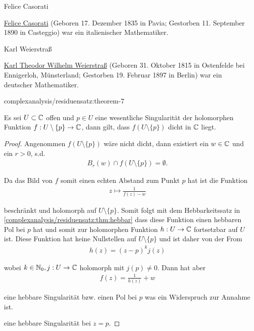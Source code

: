 \begin{emphBox}{Felice Casorati}{}

\par
\href{https://de.wikipedia.org/wiki/Felice\_Casorati\_(Mathematiker)}{Felice Casorati} (Geboren 17. Dezember 1835 in Pavia; Gestorben 11. September 1890 in Casteggio) war ein italienischer Mathematiker.
\end{emphBox}

\begin{emphBox}{Karl Weierstraß}{}

\par
\href{https://de.wikipedia.org/wiki/Karl\_Weierstra\%C3\%9F}{Karl Theodor Wilhelm Weierstraß} (Geboren 31. Oktober 1815 in Ostenfelde bei Ennigerloh, Münsterland; Gestorben 19. Februar 1897 in Berlin) war ein deutscher Mathematiker.
\end{emphBox}
\begin{theorem}{}{complexanalysis/residuensatz:theorem-7}



\par
Es sei \(U \subset \mathbb{C}\) offen und \(p\in U\) eine wesentliche Singularität der holomorphen Funktion \(f:U\setminus\{p\}\to\mathbb{C}\), dann gilt, dass \(f(U\setminus\{p\})\) dicht in \(\mathbb{C}\) liegt.
\end{theorem}

\begin{proof}
 Angenommen \(f(U\setminus\{p\})\) wäre nicht dicht, dann existiert ein \(w\in\mathbb{C}\) und ein \(r>0\), s.d.
\begin{align*}
B_r(w) \cap f(U\setminus\{p\}) = \emptyset.
\end{align*}
\par
Da das Bild von \(f\) somit einen echten Abstand zum Punkt \(p\) hat ist die Funktion
\begin{align*}
z\mapsto\frac{1}{f(z) - w}
\end{align*}
\par
beschränkt und holomorph auf \(U\setminus\{p\}\). Somit folgt mit dem Hebbarkeitssatz in \cref{complexanalysis/residuensatz:thm:hebbar}  dass diese Funktion einen hebbaren Pol bei \(p\) hat und somit zur holomorphen Funktion \(h:U\to\mathbb{C}\) fortsetzbar auf \(U\) ist. Diese Funktion hat keine Nullstellen auf \(U\setminus\{p\}\) und ist daher von der From
\begin{align*}
h(z) = (z-p)^k j(z)
\end{align*}
\par
wobei \(k\in\mathbb{N}_0, j:U\to\mathbb{C}\) holomorph mit \(j(p)\neq 0\). Dann hat aber
\begin{align*}
f(z) = \frac{1}{h(z)} + w
\end{align*}
\par
eine hebbare Singularität bzw. einen Pol bei \(p\) was ein Widerspruch zur Annahme ist.

\par
eine hebbare Singularität bei \(z=p\).
\end{proof}


